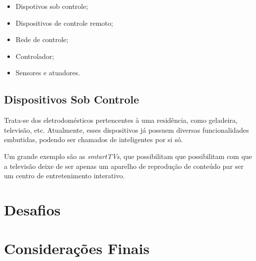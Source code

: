 \begin{itemize}
	\item Dispotivos sob controle;
	\item Dispositivos de controle remoto;
	\item Rede de controle;
	\item Controlador;
	\item Sensores e atuadores.
\end{itemize}

\subsection{Dispositivos Sob Controle}
Trata-se dos eletrodomésticos pertencentes à uma residência, como geladeira, televisão, etc. Atualmente,
esses dispositivos já possuem diversas funcionalidades embutidas, podendo ser chamados de inteligentes por si
só.

Um grande exemplo são as \textit{smtartTVs}, que possibilitam que possibilitam com que a televisão deixe de
ser apenas um aparelho de reprodução de conteúdo par ser um centro de entretenimento interativo.




\section{Desafios}

\section {Considerações Finais}
